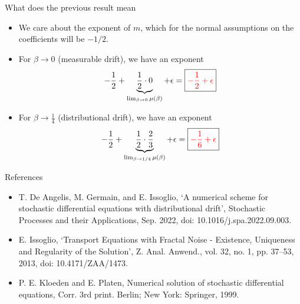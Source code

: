 \documentclass{beamer}
\begin{document}
\begin{frame}{What does the previous result mean}
    \begin{itemize}
        \item<1->
			We care about the exponent of 
			$ m $, 
			which for the normal assumptions on the coefficients will be
			$ -1/2 $.
		\item<2->
			For
			$ {\beta} \to 0 $
			(measurable drift), we have an exponent
			\begin{equation*}
				-\frac{1}{2} + \underbrace{\frac{1}{2} \cdot 0}_{\lim_{\beta \to 0} \mu(\beta)} + \epsilon = \boxed{\color{red}-\frac12 + \epsilon}
			\end{equation*}
		\item<3->
			For
			$ {\beta} \to \frac14 $
			(distributional drift), we have an exponent
			\begin{equation*}
				-\frac12 + \underbrace{\frac{1}{2} \cdot \frac23}_{\lim_{\beta \to 1/4} \mu(\beta)} + \epsilon = \boxed{\color{red}-\frac16+ \epsilon}
			\end{equation*}
    \end{itemize}
\end{frame}

\begin{frame}[allowframebreaks]{References}
	\begin{itemize}
	    \item
			T. De Angelis, M. Germain, and E. Issoglio, ‘A numerical scheme for stochastic differential equations with distributional drift’, Stochastic Processes and their Applications, Sep. 2022, doi: 10.1016/j.spa.2022.09.003.
		\item
			E. Issoglio, ‘Transport Equations with Fractal Noise - Existence, Uniqueness and Regularity of the Solution’, Z. Anal. Anwend., vol. 32, no. 1, pp. 37–53, 2013, doi: 10.4171/ZAA/1473.
		\item
			P. E. Kloeden and E. Platen, Numerical solution of stochastic differential equations, Corr. 3rd print. Berlin; New York: Springer, 1999.
	\end{itemize}
\end{frame}
\end{document}
